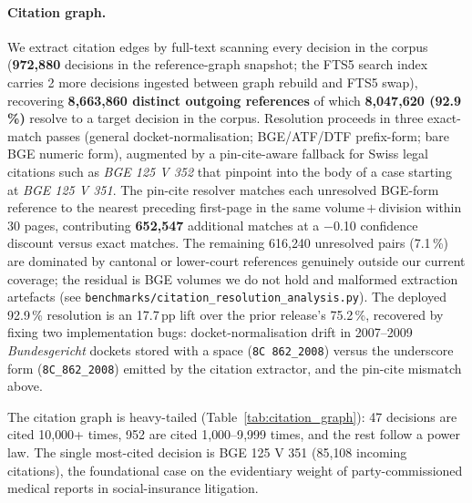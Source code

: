 \documentclass[11pt,a4paper]{article}
\begin{document}



\paragraph{Citation graph.} We extract citation edges by full-text scanning every decision in the corpus (\textbf{972{,}880} decisions in the reference-graph snapshot; the FTS5 search index carries 2 more decisions ingested between graph rebuild and FTS5 swap), recovering \textbf{8{,}663{,}860 distinct outgoing references} of which \textbf{8{,}047{,}620 (92.9\,\%)} resolve to a target decision in the corpus. Resolution proceeds in three exact-match passes (general docket-normalisation; BGE/ATF/DTF prefix-form; bare BGE numeric form), augmented by a pin-cite-aware fallback for Swiss legal citations such as \emph{BGE 125 V 352} that pinpoint into the body of a case starting at \emph{BGE 125 V 351}. The pin-cite resolver matches each unresolved BGE-form reference to the nearest preceding first-page in the same volume\,$+$\,division within 30 pages, contributing \textbf{652{,}547} additional matches at a $-$0.10 confidence discount versus exact matches. The remaining 616{,}240 unresolved pairs (7.1\,\%) are dominated by cantonal or lower-court references genuinely outside our current coverage; the residual is BGE volumes we do not hold and malformed extraction artefacts (see \texttt{benchmarks/citation\_resolution\_analysis.py}). The deployed 92.9\,\% resolution is an 17.7\,pp lift over the prior release's 75.2\,\%, recovered by fixing two implementation bugs: docket-normalisation drift in 2007--2009 \emph{Bundesgericht} dockets stored with a space (\texttt{8C 862\_2008}) versus the underscore form (\texttt{8C\_862\_2008}) emitted by the citation extractor, and the pin-cite mismatch above.

The citation graph is heavy-tailed (Table~\ref{tab:citation_graph}): 47 decisions are cited 10{,}000+ times, 952 are cited 1{,}000--9{,}999 times, and the rest follow a power law. The single most-cited decision is BGE 125 V 351 (85{,}108 incoming citations), the foundational case on the evidentiary weight of party-commissioned medical reports in social-insurance litigation.
\end{document}
